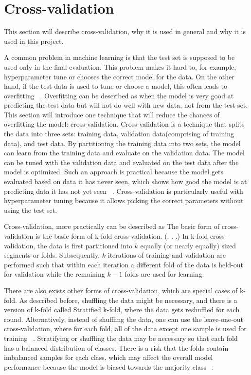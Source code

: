 \section{Cross-validation}\label{sec:cross-validation}

This section will describe cross-validation, why it is used in general and why it is used in this project.

A common problem in machine learning is that the test set is supposed to be used only in the final evaluation. This problem makes it hard to, for example, hyperparameter tune or chooses the correct model for the data. On the other hand, if the test data is used to tune or choose a model, this often leads to overfitting ~\cite{james-statistical-learning}.
Overfitting can be described as when the model is very good at predicting the test data but will not do well with new data, not from the test set. This section will introduce one technique that will reduce the chances of overfitting the model: cross-validation. Cross-validation is a technique that splits the data into three sets: training data, validation data(comprising of training data), and test data. By partitioning the training data into two sets, the model can learn from the training data and evaluate on the validation data. The model can be tuned with the validation data and evaluated on the test data after the model is optimized. Such an approach is practical because the model gets evaluated based on data it has never seen, which shows how good the model is at predicting data it has not yet seen ~\cite{scikit-learn-ml}. Cross-validation is particularly useful with hyperparameter tuning because it allows picking the correct parameters without using the test set.


Cross-validation, more practically can be described as 
{The basic form of cross-validation is the basic form of k-fold cross-validation. (. . .) In k-fold cross-validation, the data is first partitioned into $k$ equally (or nearly equally) sized segments or folds. Subsequently, $k$ iterations of training and validation are performed such that within each iteration a different fold of the data is held-out for validation while the remaining $k-1$ folds are used for learning.}

There are also exists other forms of cross-validation, which are special cases of k-fold. As described before, shuffling the data might be necessary, and there is a version of k-fold called Stratified k-fold, where the data gets reshuffled for each round. Alternatively, instead of shuffling the data, one can use the leave-one-out cross-validation, where for each fold, all of the data except one sample is used for training ~\cite{Refaeilzadeh2009}. Stratifying or shuffling the data may be necessary so that each fold has a balanced distribution of classes. There is a risk that the folds contain imbalanced samples for each class, which may affect the overall model performance because the model is biased towards the majority class ~\cite{Refaeilzadeh2009}.

